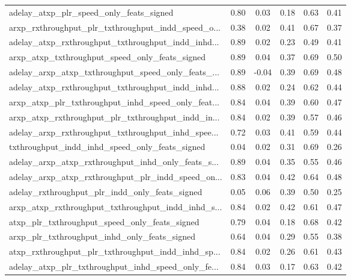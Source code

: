 \begin{tabular}{|l|*{4}{c}|r|}
adelay\_atxp\_plr\_speed\_only\_feats\_signed            & 0.80 &  0.03 &    0.18 &       0.63 &  0.41 \\
arxp\_rxthroughput\_plr\_txthroughput\_indd\_speed\_o... & 0.38 &  0.02 &    0.41 &       0.67 &  0.37 \\
adelay\_atxp\_rxthroughput\_txthroughput\_indd\_inhd... & 0.89 &  0.02 &    0.23 &       0.49 &  0.41 \\
arxp\_atxp\_txthroughput\_speed\_only\_feats\_signed     & 0.89 &  0.04 &    0.37 &       0.69 &  0.50 \\
adelay\_arxp\_atxp\_txthroughput\_speed\_only\_feats\_... & 0.89 & -0.04 &    0.39 &       0.69 &  0.48 \\
adelay\_atxp\_rxthroughput\_txthroughput\_indd\_inhd... & 0.88 &  0.02 &    0.24 &       0.62 &  0.44 \\
arxp\_atxp\_plr\_txthroughput\_inhd\_speed\_only\_feat... & 0.84 &  0.04 &    0.39 &       0.60 &  0.47 \\
arxp\_atxp\_rxthroughput\_plr\_txthroughput\_indd\_in... & 0.84 &  0.02 &    0.39 &       0.57 &  0.46 \\
adelay\_arxp\_rxthroughput\_txthroughput\_inhd\_spee... & 0.72 &  0.03 &    0.41 &       0.59 &  0.44 \\
txthroughput\_indd\_inhd\_speed\_only\_feats\_signed     & 0.04 &  0.02 &    0.31 &       0.69 &  0.26 \\
adelay\_arxp\_atxp\_rxthroughput\_inhd\_only\_feats\_s... & 0.89 &  0.04 &    0.35 &       0.55 &  0.46 \\
adelay\_arxp\_atxp\_rxthroughput\_plr\_indd\_speed\_on... & 0.83 &  0.04 &    0.42 &       0.64 &  0.48 \\
adelay\_rxthroughput\_plr\_indd\_only\_feats\_signed     & 0.05 &  0.06 &    0.39 &       0.50 &  0.25 \\
arxp\_atxp\_rxthroughput\_txthroughput\_indd\_inhd\_s... & 0.84 &  0.02 &    0.42 &       0.61 &  0.47 \\
atxp\_plr\_txthroughput\_speed\_only\_feats\_signed      & 0.79 &  0.04 &    0.18 &       0.68 &  0.42 \\
arxp\_plr\_txthroughput\_inhd\_only\_feats\_signed       & 0.64 &  0.04 &    0.29 &       0.55 &  0.38 \\
atxp\_rxthroughput\_plr\_txthroughput\_indd\_inhd\_sp... & 0.84 &  0.02 &    0.26 &       0.61 &  0.43 \\
adelay\_atxp\_plr\_txthroughput\_inhd\_speed\_only\_fe... & 0.84 &  0.03 &    0.17 &       0.63 &  0.42 \\

\end{tabular}
